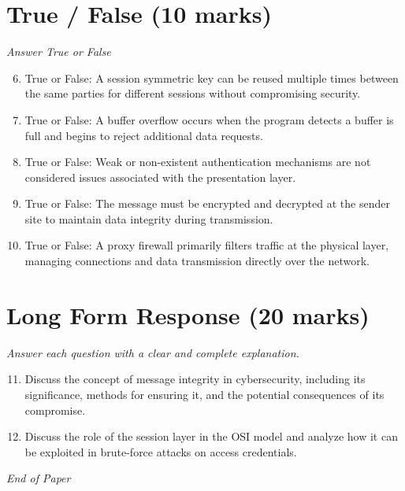 \documentclass[12pt]{article}
\begin{document}
\section*{True / False (10 marks)}
\textit{Answer True or False}
\begin{enumerate}[label=\arabic*.]
\setcounter{enumi}{5}
\item True or False: A session symmetric key can be reused multiple times between the same parties for different sessions without compromising security.
\item True or False: A buffer overflow occurs when the program detects a buffer is full and begins to reject additional data requests.
\item True or False: Weak or non-existent authentication mechanisms are not considered issues associated with the presentation layer.
\item True or False: The message must be encrypted and decrypted at the sender site to maintain data integrity during transmission.
\item True or False: A proxy firewall primarily filters traffic at the physical layer, managing connections and data transmission directly over the network.
\end{enumerate}

\section*{Long Form Response (20 marks)}
\textit{Answer each question with a clear and complete explanation.}
\begin{enumerate}[label=\arabic*.]
\setcounter{enumi}{10}
\item Discuss the concept of message integrity in cybersecurity, including its significance, methods for ensuring it, and the potential consequences of its compromise.
\item Discuss the role of the session layer in the OSI model and analyze how it can be exploited in brute-force attacks on access credentials.
\end{enumerate}

\vfill
\noindent\textit{End of Paper}
\end{document}
